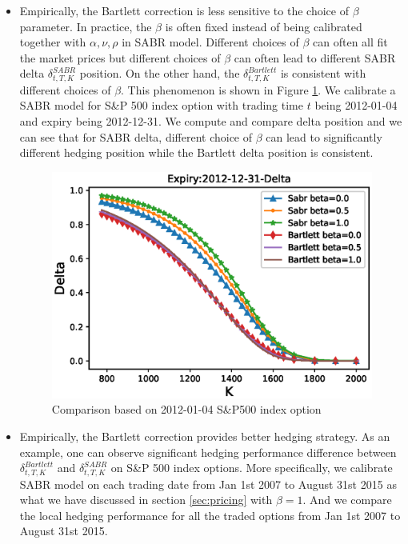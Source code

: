 \documentclass[letterpaper,12pt,titlepage,oneside,final]{book}
\numberwithin{equation}{section}
\theoremstyle{definition}
\begin{document}
\begin{itemize}
    \item Empirically, the Bartlett correction is less sensitive to the choice of $\beta$ parameter. In practice, the $\beta$ is often fixed instead of being calibrated together with $\alpha,\nu,\rho$ in SABR model. Different choices of $\beta$ can often all fit the market prices but different choices of $\beta$ can often lead to different SABR delta $\delta^{SABR}_{t,T,K}$ position. On the other hand, the $\delta^{Bartlett}_{t,T,K}$ is consistent with different choices of $\beta$. This phenomenon is shown in Figure \ref{fig:Bartlett}. We calibrate a SABR model for S\&P 500 index option with trading time $t$ being 2012-01-04 and expiry being 2012-12-31. We compute and compare delta position and we can see that for SABR delta, different choice of $\beta$ can lead to  significantly different hedging position while the Bartlett delta position is consistent.
    \begin{figure}[htp!]
        \includegraphics[width=\textwidth]{./figures/Bartlett}
        \caption{Comparison based on 2012-01-04 S\&P500 index option}
        \label{fig:Bartlett}
    \end{figure}
    \item  Empirically, the Bartlett correction provides better hedging strategy. As an example, one can observe significant  hedging performance difference between $\delta^{Bartlett}_{t,T,K}$ and  $\delta^{SABR}_{t,T,K}$  on S\&P 500 index options. More specifically, we calibrate SABR model on each trading date from Jan 1st 2007 to August 31st 2015 as what we have discussed in section \ref{sec:pricing} with $\beta=1$. And we compare the local hedging performance for all the traded options from Jan 1st 2007 to August 31st 2015.

\end{itemize}
\end{document}
